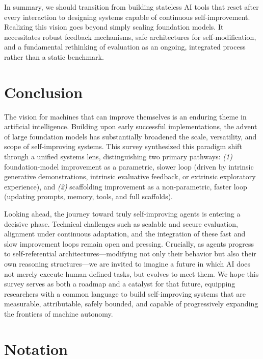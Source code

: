 \documentclass{article}
\begin{document}
\vspace{0.35em}
\noindent
In summary, we should transition from building stateless AI tools that reset after every interaction to designing systems capable of continuous self-improvement. Realizing this vision goes beyond simply scaling foundation models. It necessitates robust feedback mechanisms, safe architectures for self-modification, and a fundamental rethinking of evaluation as an ongoing, integrated process rather than a static benchmark.


\section{Conclusion}
\label{sec:Conclusion}

The vision for machines that can improve themselves is an enduring theme in artificial intelligence. Building upon early successful implementations, the advent of large foundation models has substantially broadened the scale, versatility, and scope of self-improving systems. This survey synthesized this paradigm shift through a unified systems lens, distinguishing two primary pathways: \textit{(1)} foundation-model improvement as a parametric, slower loop (driven by intrinsic generative demonstrations, intrinsic evaluative feedback, or extrinsic exploratory experience), and \textit{(2)} scaffolding improvement as a non-parametric, faster loop (updating prompts, memory, tools, and full scaffolds).

Looking ahead, the journey toward truly self-improving agents is entering a decisive phase. Technical challenges such as scalable and secure evaluation, alignment under continuous adaptation, and the integration of these fast and slow improvement loops remain open and pressing. Crucially, as agents progress to self-referential architectures—modifying not only their behavior but also their own reasoning structures—we are invited to imagine a future in which AI does not merely execute human-defined tasks, but evolves to meet them. We hope this survey serves as both a roadmap and a catalyst for that future, equipping researchers with a common language to build self-improving systems that are measurable, attributable, safely bounded, and capable of progressively expanding the frontiers of machine autonomy.





\clearpage
\appendix

\section*{Notation}
\label{sec:Notation}
\end{document}
